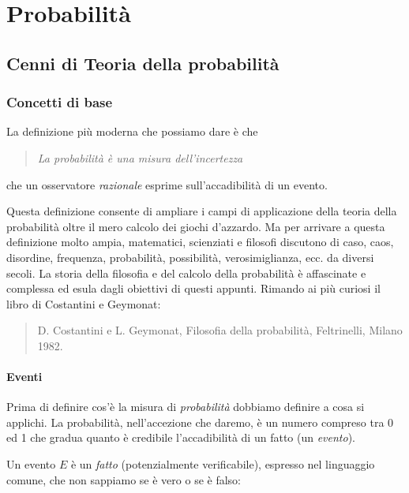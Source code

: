 \documentclass[
  11pt,
]{book}
\theoremstyle{mytheoremstyle}
\theoremstyle{mydefstyle}
\begin{document}
\part{Probabilità}

\chapter{Cenni di Teoria della probabilità}\label{cenni-di-teoria-della-probabilituxe0}

\section{Concetti di base}\label{concetti-di-base}

La definizione più moderna che possiamo dare è che

\begin{quote}
\emph{La probabilità è una misura dell'incertezza}
\end{quote}

che un osservatore \emph{razionale} esprime sull'accadibilità di un evento.

Questa definizione consente di ampliare i campi di applicazione della
teoria della probabilità oltre il mero calcolo dei giochi d'azzardo. Ma
per arrivare a questa definizione molto ampia, matematici, scienziati e
filosofi discutono di caso, caos, disordine, frequenza, probabilità,
possibilità, verosimiglianza, ecc. da diversi secoli. La storia della
filosofia e del calcolo della probabilità è affascinate e complessa ed
esula dagli obiettivi di questi appunti. Rimando ai più curiosi il libro
di Costantini e Geymonat:

\begin{quote}
D. Costantini e L. Geymonat, Filosofia della probabilità, Feltrinelli,
Milano 1982.
\end{quote}

\subsection{Eventi}\label{eventi}

Prima di definire cos'è la misura di \emph{probabilità} dobbiamo definire a cosa
si applichi. La probabilità, nell'accezione che daremo, è un numero compreso
tra 0 ed 1 che gradua quanto è credibile l'accadibilità di un fatto (un \emph{evento}).

Un evento \(E\) è un \emph{fatto} (potenzialmente verificabile), espresso nel
linguaggio comune, che non sappiamo se è vero o se è falso:
\end{document}
